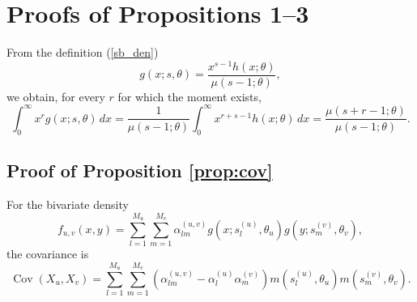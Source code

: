 \documentclass[eng]{csam}
\begin{document}
{\appendix
\renewcommand{\theequation}{\thesection.\arabic{equation}}

\section{Proofs of Propositions 1--3}\label{app:props}

From the definition (\ref{sb_den})
\begin{equation*}
g(x;s,\theta) =\frac{x^{s-1}h(x;\theta)}{\mu(s-1;\theta)},
\end{equation*}
we obtain, for every $r$ for which the moment exists,
\begin{equation}\label{A1}
\int_0^\infty x^r g(x;s,\theta)\,dx
= \frac{1}{\mu(s-1;\theta)} \int_0^\infty x^{r+s-1}h(x;\theta)\,dx
= \frac{\mu(s+r-1;\theta)}{\mu(s-1;\theta)}.
\end{equation}

\subsection*{Proof of Proposition \ref{prop:cov}}

For the bivariate density
\begin{equation*}
f_{u,v}(x,y) = \sum_{l=1}^{M_u}\sum_{m=1}^{M_v} \alpha^{(u,v)}_{lm} g(x;s_l^{(u)},\theta_u) g(y;s_m^{(v)},\theta_v),
\end{equation*}
the covariance is
\begin{equation*}
\operatorname{Cov}(X_u,X_v) = \sum_{l=1}^{M_u}\sum_{m=1}^{M_v} \left( \alpha^{(u,v)}_{lm} -\alpha_l^{(u)}\alpha_m^{(v)} \right) m(s_l^{(u)},\theta_u)m(s_m^{(v)},\theta_v).
\end{equation*}

}
\end{document}
